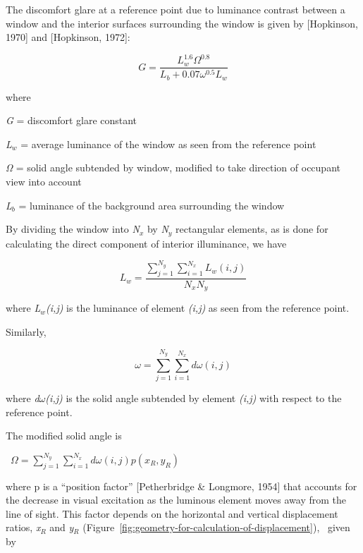 The discomfort glare at a reference point due to luminance contrast between a window and the interior surfaces surrounding the window is given by {[}Hopkinson, 1970{]} and {[}Hopkinson, 1972{]}:

\begin{equation}
G = \frac{{L_w^{1.6}{\Omega ^{0.8}}}}{{{L_b} + 0.07{\omega ^{0.5}}{L_w}}}
\end{equation}

where

\emph{G} = discomfort glare constant

\emph{L\(_{w}\)} = average luminance of the window as seen from the reference point

\emph{Ω} = solid angle subtended by window, modified to take direction of occupant view into account

\emph{L\(_{b}\)} = luminance of the background area surrounding the window

By dividing the window into \emph{N\(_{x}\)} by \emph{N\(_{y}\)} rectangular elements, as is done for calculating the direct component of interior illuminance, we have

\begin{equation}
{L_w} = \frac{{\sum\limits_{j = 1}^{{N_y}} {\sum\limits_{i = 1}^{{N_x}} {{L_w}(i,j)} } }}{{{N_x}{N_y}}}
\end{equation}

where \emph{L\(_{w}\)(i,j)} is the luminance of element \emph{(i,j)} as seen from the reference point.

Similarly,

\begin{equation}
\omega  = \sum\limits_{j = 1}^{{N_y}} {\sum\limits_{i = 1}^{{N_x}} {d\omega (i,j)} }
\end{equation}

where \emph{d$\omega$(i,j)} is the solid angle subtended by element \emph{(i,j)} with respect to the reference point.

The modified solid angle is

~\(\Omega = \sum\limits_{j = 1}^{{N_y}} {\sum\limits_{i = 1}^{{N_x}} {d\omega (i,j)} } p({x_R},{y_R})\)

where p is a ``position factor'' {[}Petherbridge \& Longmore, 1954{]} that accounts for the decrease in visual excitation as the luminous element moves away from the line of sight. This factor depends on the horizontal and vertical displacement ratios, \emph{x\(_{R}\)} and \emph{y\(_{R}\)} (Figure~\ref{fig:geometry-for-calculation-of-displacement}),~ given by

